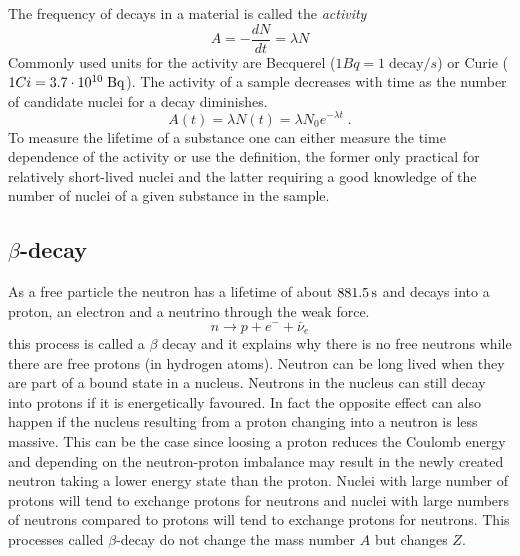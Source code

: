 \documentclass[12pt]{article}
\begin{document}
The frequency of decays in a material is called the \emph{activity}
\[A=-\frac{dN}{dt}=\lambda N\]
Commonly used units for the activity are Becquerel ($1 Bq=1\;\mbox{decay}/s$) or Curie ($1 Ci=3.7\cdot 10^{10}\;\rm Bq$). The activity of a sample decreases with time as the number of candidate nuclei for a decay diminishes.
\[A(t)=\lambda N(t)=\lambda N_0 e^{-\lambda t}\;.\]
To measure the lifetime of a substance one can either measure the time dependence of the activity or use the definition, the former only practical for relatively short-lived nuclei and the latter requiring a good knowledge of the number of nuclei of a given substance in the sample.
%
%
%
\subsection{$\beta$-decay}
%
%
%
As a free particle the neutron has a lifetime of about $881.5\,\rm{s}$ and decays into a proton, an electron and a neutrino through the weak force. 
\begin{equation}\label{eq:beta}
n\rightarrow p+e^-+\bar{\nu}_e
\end{equation}
this process is called a $\beta$ decay and it explains why there is no free neutrons while there are free protons (in hydrogen atoms). Neutron can be long lived when they are part of a bound state in a nucleus. Neutrons in the nucleus can still decay into protons if it is energetically favoured. In fact the opposite effect can also happen if the nucleus resulting from a proton changing into a neutron is less massive. This can be the case since loosing a proton reduces the Coulomb energy and depending on the neutron-proton imbalance may result in the newly created neutron taking a lower energy state than the proton. Nuclei with large number of protons will tend to exchange protons for neutrons and nuclei with large numbers of neutrons compared to protons will tend to exchange protons for neutrons. This processes called $\beta$-decay do not change the mass number $A$ but changes $Z$. 
\end{document}
